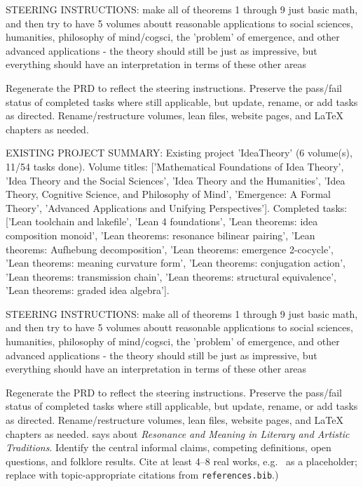 STEERING INSTRUCTIONS: make all of theorems 1 through 9 just basic math, and then try to have 5 volumes aboutt reasonable applications to social sciences, humanities, philosophy of mind/cogsci, the 'problem' of emergence, and other advanced applications - the theory should still be just as impressive, but everything should have an interpretation in terms of these other areas

Regenerate the PRD to reflect the steering instructions. Preserve the pass/fail status of completed tasks where still applicable, but update, rename, or add tasks as directed. Rename/restructure volumes, lean files, website pages, and LaTeX chapters as needed.

EXISTING PROJECT SUMMARY: Existing project 'IdeaTheory' (6 volume(s), 11/54 tasks done). Volume titles: ['Mathematical Foundations of Idea Theory', 'Idea Theory and the Social Sciences', 'Idea Theory and the Humanities', 'Idea Theory, Cognitive Science, and Philosophy of Mind', 'Emergence: A Formal Theory', 'Advanced Applications and Unifying Perspectives']. Completed tasks: ['Lean toolchain and lakefile', 'Lean 4 foundations', 'Lean theorems: idea composition monoid', 'Lean theorems: resonance bilinear pairing', 'Lean theorems: Aufhebung decomposition', 'Lean theorems: emergence 2-cocycle', 'Lean theorems: meaning curvature form', 'Lean theorems: conjugation action', 'Lean theorems: transmission chain', 'Lean theorems: structural equivalence', 'Lean theorems: graded idea algebra'].

STEERING INSTRUCTIONS: make all of theorems 1 through 9 just basic math, and then try to have 5 volumes aboutt reasonable applications to social sciences, humanities, philosophy of mind/cogsci, the 'problem' of emergence, and other advanced applications - the theory should still be just as impressive, but everything should have an interpretation in terms of these other areas

Regenerate the PRD to reflect the steering instructions. Preserve the pass/fail status of completed tasks where still applicable, but update, rename, or add tasks as directed. Rename/restructure volumes, lean files, website pages, and LaTeX chapters as needed. says about \emph{Resonance and Meaning in Literary and Artistic Traditions}.  Identify the
        central informal claims, competing definitions, open questions, and
        folklore results.  Cite at least 4--8 real works, e.g.\ \cite{
        lean4_tpil} as a placeholder; replace with topic-appropriate
        citations from \texttt{references.bib}.)

